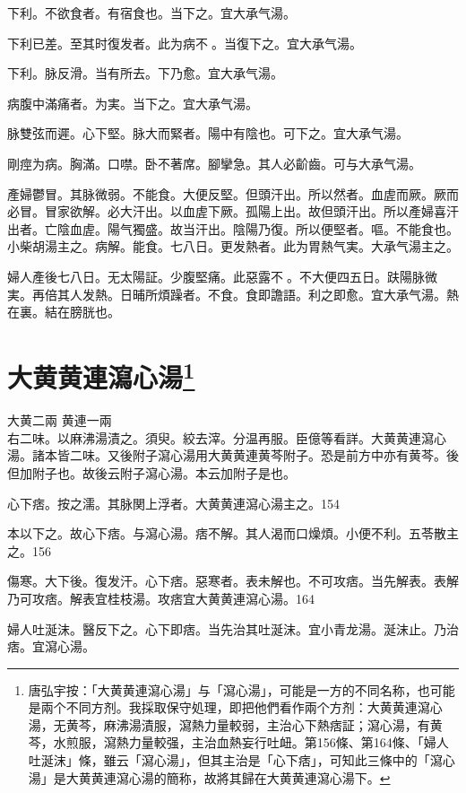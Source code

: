 下利。不欲食者。有宿食也。当下之。宜{\khaai 大}承气湯。

下利{\khaai 已}差。至其时復发者。此为病不{\sungii 𥁞}。当{\khaai 復}下之。宜{\khaai 大}承气湯。

下利。脉反滑。当有所去。下乃愈。宜大承气湯。

病腹中滿痛者。为実。当下之。宜大承气湯。

脉雙弦而遲。心下堅。脉大而緊者。陽中有陰也。可下之。宜{\khaai 大}承气湯。

剛痙为病。胸滿。口噤。卧不著席。腳攣急。其人必齘齒。可与大承气湯。

產婦鬱{\khaai 冒}。其脉微弱。不能食。大便反堅。但頭汗出。所以然者。血虗而厥。厥而必冒。冒家欲解。必大汗出。以血虗下厥。孤陽上出。故但頭汗出。所以產婦喜汗出者。亡陰血虗。陽气獨盛。故当汗出。陰陽乃復。所以便堅者。嘔。不能食也。小柴胡湯主之。病解。能食。七八日。更发熱者。此为胃熱气実。大承气湯主之。

婦人產後七八日。无太陽証。少腹堅痛。此惡露不{\sungii 𥁞}。不大便四五日。趺陽脉微実。再倍其人发熱。日晡所煩躁者。不食。食即譫語。利之即愈。宜大承气湯。熱在裏。結在膀胱也。

\section{大黄黄連瀉心湯\footnote{唐弘宇按：「大黄黄連瀉心湯」与「瀉心湯」，可能是一方的不同名称，也可能是兩个不同方剂。我採取保守処理，即把他們看作兩个方剂：大黄黄連瀉心湯，无黄芩，麻沸湯漬服，瀉熱力量較弱，主治心下熱痞証；瀉心湯，有黄芩，水煎服，瀉熱力量較强，主治血熱妄行吐衄。第156條、第164條、「婦人吐涎沫」條，雖云「瀉心湯」，但其主治是「心下痞」，可知此三條中的「瀉心湯」是大黄黄連瀉心湯的簡称，故將其歸在大黄黄連瀉心湯下。}}

大黄{\scriptsize 二兩} 黄連{\scriptsize 一兩}\\
右二味。以麻沸湯漬之。須臾。絞去滓。分温再服。{\scriptsize 臣億等看詳。大黄黄連瀉心湯。諸本皆二味。又後附子瀉心湯用大黄黄連黄芩附子。恐是前方中亦有黄芩。後但加附子也。故後云附子瀉心湯。本云加附子是也。}

心下痞。按之濡。其脉関上浮者。大黄{\khaai 黄連}瀉心湯主之。154

本以下之。故心下痞。与瀉心湯。痞不解。其人渴而口燥{\khaai 煩}。小便不利。五苓散主之。156

傷寒。大下後。復发汗。心下痞。惡寒者。表未解也。不可攻痞。当先解表。表解乃可攻痞。解表宜桂枝湯。攻痞宜大黄黄連瀉心湯。164

婦人吐涎沫。醫反下之。心下即痞。当先治其吐涎沫。宜小青龙湯。涎沫止。乃治痞。宜瀉心湯。

